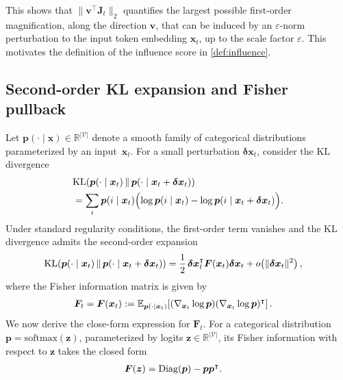 \documentclass{article}
\begin{document}
This shows that $\|\bm{v}^\intercal \bm{J}_t\|_2$ quantifies the largest possible first-order magnification, along the direction $\bm{v}$, that can be induced by an $\varepsilon$-norm perturbation to the input token embedding $\bm{x}_t$, up to the scale factor $\varepsilon$.
This motivates the definition of the influence score in \cref{def:influence}.



\subsection{Second-order KL expansion and Fisher pullback}
\label{app:kl_second_order}

Let $\bm{p}(\cdot\mid \bm{x}) \in \mathbb{R}^{|\mathcal{V}|}$ denote a smooth family of
categorical distributions parameterized by an input~$\bm{x}_t$.
For a small perturbation $\bm{\delta x}_t$, consider the KL divergence
\begin{align}
&\mathrm{KL}\!\left(
\bm{p}(\cdot\mid \bm{x}_t)
\,\middle\|\,
\bm{p}(\cdot\mid \bm{x}_t+\bm{\delta x}_t)
\right) \notag \\
&=
\sum_{i}
\bm{p}(i\mid \bm{x}_t)
\Bigl(
\log \bm{p}(i\mid \bm{x}_t)
-
\log \bm{p}(i\mid \bm{x}_t+\bm{\delta x}_t)
\Bigr).
\notag
\end{align}
Under standard regularity conditions, the first-order term vanishes and
the KL divergence admits the second-order expansion
\begin{align}
\mathrm{KL}\!\left(
\bm{p}(\cdot\mid \bm{x}_t)
\,\middle\|\,
\bm{p}(\cdot\mid \bm{x}_t+\bm{\delta x}_t)
\right)
&=
\frac{1}{2}\,
\bm{\delta x}_t^\intercal
\bm{F}(\bm{x}_t)
\bm{\delta x}_t
+
o\!\left(\|\bm{\delta x}_t\|^2\right),
\notag
\end{align}
where the Fisher information matrix is given by \cite{amari2000methods}
\begin{align}
\bm{F}_t = \bm{F}(\bm{x}_t)
&:=
\mathbb{E}_{\bm{p}(\cdot\mid \bm{x}_t)}
\!\left[
(\nabla_{\bm{x}_t} \log \bm{p})
(\nabla_{\bm{x}_t} \log \bm{p})^\intercal
\right].
\notag
\end{align}
We now derive the close-form expression for $\bm{F}_t$.
For a categorical distribution $\bm{p} = \mathrm{softmax}(\bm{z})$,
parameterized by logits $\bm{z} \in \mathbb{R}^{|\mathcal{V}|}$,
its Fisher information with respect to $\bm{z}$ takes the closed form
\cite{bishop2006pattern}
\begin{align}
\bm{F}(\bm{z})
&=
\mathrm{Diag}(\bm{p}) - \bm{p}\bm{p}^\intercal .
\notag
\end{align}
\end{document}
